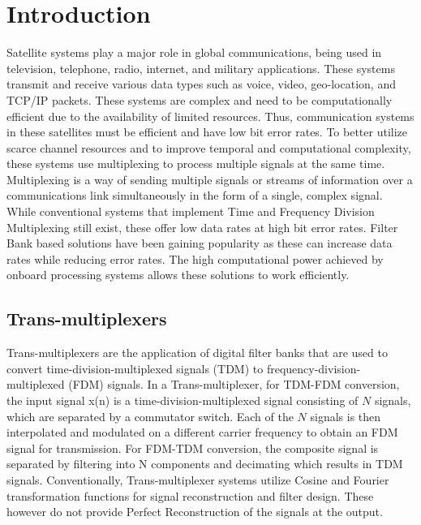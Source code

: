 \chapter{Introduction}
Satellite systems play a major role in global communications, being used in television, telephone, radio, internet, and military applications. These systems transmit and receive various data types such as voice, video, geo-location, and TCP/IP packets. These systems are complex and need to be computationally efficient due to the availability of limited resources. Thus, communication systems in these satellites must be efficient and have low bit error rates. To better utilize scarce channel resources and to improve temporal and computational complexity, these systems use multiplexing to process multiple signals at the same time. Multiplexing is a way of sending multiple signals or streams of information over a communications link simultaneously in the form of a single, complex signal. While conventional systems that implement Time and Frequency Division Multiplexing still exist, these offer low data rates at high bit error rates. Filter Bank based solutions have been gaining popularity as these can increase data rates while reducing error rates. The high computational power achieved by onboard processing systems allows these solutions to work efficiently. \par
\section{Trans-multiplexers}
Trans-multiplexers are the application of digital filter banks that are used to convert time-division-multiplexed signals (TDM) to frequency-division-multiplexed (FDM) signals. In a Trans-multiplexer, for TDM-FDM conversion, the input signal {x(n)} is a time-division-multiplexed signal consisting of $N$ signals, which are separated by a commutator switch. Each of the $N$ signals is then interpolated and modulated on a different carrier frequency to obtain an FDM signal for transmission. For FDM-TDM conversion, the composite signal is separated by filtering into N components and decimating which results in TDM signals. Conventionally, Trans-multiplexer systems utilize Cosine and Fourier transformation functions for signal reconstruction and filter design. These however do not provide Perfect Reconstruction of the signals at the output. \par
\newpage
